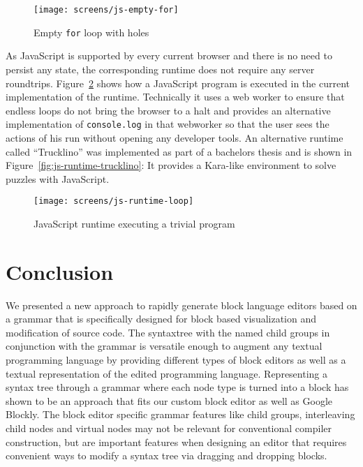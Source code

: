 \documentclass[sigconf,natbib=false]{acmart}
\newcommand{\enquote}[1]{``#1''}
\begin{document}
\begin{figure}[H]
  \texttt{[image: screens/js-empty-for]}
  \caption{Empty \texttt{for} loop with holes}
  \label{fig:screen-js-empty-for}
\end{figure}

As JavaScript is supported by every current browser and there is no need to persist any state, the corresponding runtime does not require any server roundtrips. Figure~\ref{fig:screen-js-runtime-loop} shows how a JavaScript program is executed in the current implementation of the runtime. Technically it uses a web worker to ensure that endless loops do not bring the browser to a halt and provides an alternative implementation of \texttt{console.log} in that webworker so that the user sees the actions of his run without opening any developer tools. An alternative runtime called \enquote{Trucklino} was implemented as part of a bachelors thesis\cite{popp_konzeption_2019} and is shown in Figure~\ref{fig:js-runtime-trucklino}: It provides a Kara-like\cite{hartmann_kara_2001} environment to solve puzzles with JavaScript.

\begin{figure}
  \texttt{[image: screens/js-runtime-loop]}
  \caption{JavaScript runtime executing a trivial program}
  \label{fig:screen-js-runtime-loop}
\end{figure}

\section{Conclusion}

We presented a new approach to rapidly generate block language editors based on a grammar that is specifically designed for block based visualization and modification of source code. The syntaxtree with the named child groups in conjunction with the grammar is versatile enough to augment any textual programming language by providing different types of block editors as well as a textual representation of the edited programming language. Representing a syntax tree through a grammar where each node type is turned into a block has shown to be an approach that fits our custom block editor as well as Google Blockly. The block editor specific grammar features like child groups, interleaving child nodes and virtual nodes may not be relevant for conventional compiler construction, but are important features when designing an editor that requires convenient ways to modify a syntax tree via dragging and dropping blocks.
\end{document}

